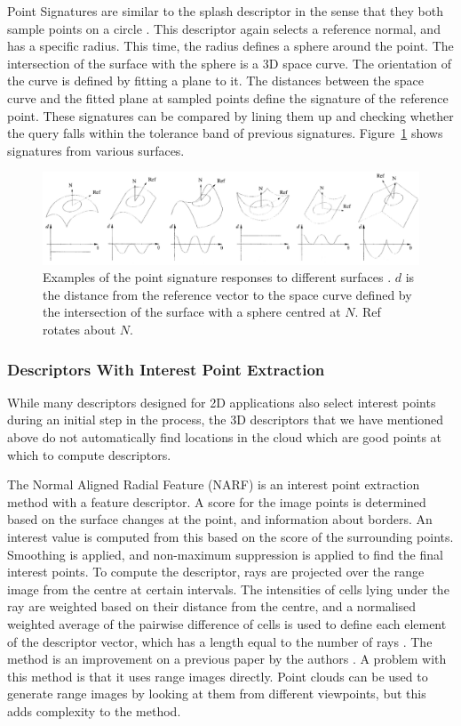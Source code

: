\documentclass[11pt,a4paper]{kth-mag}
\begin{document}
Point Signatures are similar to the splash descriptor in the sense that they
both sample points on a circle \cite{chua1997point}. This descriptor again
selects a reference normal, and has a specific radius. This time, the radius
defines a sphere around the point. The intersection of the surface with the
sphere is a 3D space curve. The orientation of the curve is defined by fitting a
plane to it. The distances between the space curve and the fitted plane at
sampled points define the signature of the reference point. These signatures can
be compared by lining them up and checking whether the query falls within the
tolerance band of previous signatures. Figure~\ref{fig:pointsig} shows
signatures from various surfaces.

\begin{figure}
  \centering
  \includegraphics[width=\textwidth]{images/pointsig}
  \caption{Examples of the point signature responses to different surfaces
    \cite{chua1997point}. $d$ is the distance from the reference vector to the
    space curve defined by the intersection of the surface with a sphere centred
    at $N$. Ref rotates about $N$.}
  \label{fig:pointsig}
\end{figure}

\subsubsection{Descriptors With Interest Point Extraction}
While many descriptors designed for 2D applications also select interest points
during an initial step in the process, the 3D descriptors that we have mentioned
above do not automatically find locations in the cloud which are good points at
which to compute descriptors.

The Normal Aligned Radial Feature (NARF) is an interest point extraction method
with a feature descriptor. A score for the image points is determined based on
the surface changes at the point, and information about borders. An interest
value is computed from this based on the score of the surrounding points.
Smoothing is applied, and non-maximum suppression is applied to find the final
interest points. To compute the descriptor, rays are projected over the range
image from the centre at certain intervals. The intensities of cells lying under
the ray are weighted based on their distance from the centre, and a normalised
weighted average of the pairwise difference of cells is used to define each
element of the descriptor vector, which has a length equal to the number of rays
\cite{steder2011point}. The method is an improvement on a previous paper by the
authors \cite{steder2009robust}. A problem with this method is that it uses
range images directly. Point clouds can be used to generate range images by
looking at them from different viewpoints, but this adds complexity to the
method.
\end{document}
